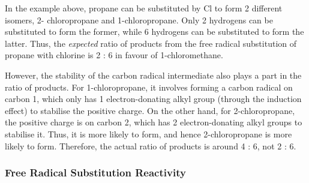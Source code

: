 


			In the example above, propane can be substituted by Cl to form 2 different isomers, 2- chloropropane and 1-chloropropane.
			Only 2 hydrogens can be substituted to form the former, while 6 hydrogens can be substituted to form the latter. Thus, the
			\textit{expected} ratio of products from the free radical substitution of propane with chlorine is 2 : 6 in
			favour of 1-chloromethane.

			However, the stability of the carbon radical intermediate also plays a part in the ratio of products. For 1-chloropropane,
			it involves forming a carbon radical on carbon 1, which only has 1 electron-donating alkyl group (through the induction effect)
			to stabilise the positive charge. On the other hand, for 2-chloropropane, the positive charge is on carbon 2, which
			has 2 electron-donating alkyl groups to stabilise it. Thus, it is more likely to form, and hence 2-chloropropane is more
			likely to form.	Therefore, the actual ratio of products is around 4 : 6, not 2 : 6.



		\subsubsection{Free Radical Substitution Reactivity}

